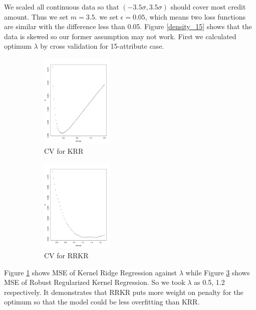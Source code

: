 \documentclass[11pt, oneside]{article}   	%
\newcommand{\reffig}[1]{Figure \ref{#1}\hspace{2pt}}
\begin{document}
We scaled all continuous data so that $(-3.5\sigma, 3.5\sigma)$ should cover most credit amount.  Thus we set $m=3.5$.  we set $\epsilon=0.05$, which means two loss functions are similar with the difference less than 0.05.  \reffig{density_15} shows that the data is skewed so our former assumption may not work.  First we calculated optimum $\lambda$ by cross validation for 15-attribute case.
\begin{figure}[h]
        \centering
        \begin{subfigure}[b]{0.475\textwidth}
            \centering
            \includegraphics[width=\textwidth, height=4.5cm]{krr_15_cv.pdf}
            \caption{CV for KRR}\label{krr_15_cv}
        \end{subfigure}
        \quad
        \begin{subfigure}[b]{0.475\textwidth}
            \centering
            \includegraphics[width=\textwidth, height=4.5cm]{rrkr_15_cv.pdf}
            \caption{CV for RRKR}\label{rrkr_15_cv}
        \end{subfigure}
        \caption{}
\end{figure}
\reffig{krr_15_cv} shows MSE of Kernel Ridge Regression against $\lambda$ while \reffig{rrkr_15_cv} shows MSE of Robust Regularized Kernel Regression.  So we took $\lambda$ as 0.5, 1.2 respectively.  It demonstrates that RRKR puts more weight on penalty for the optimum so that the model could be less overfitting than KRR.\\
\end{document}
